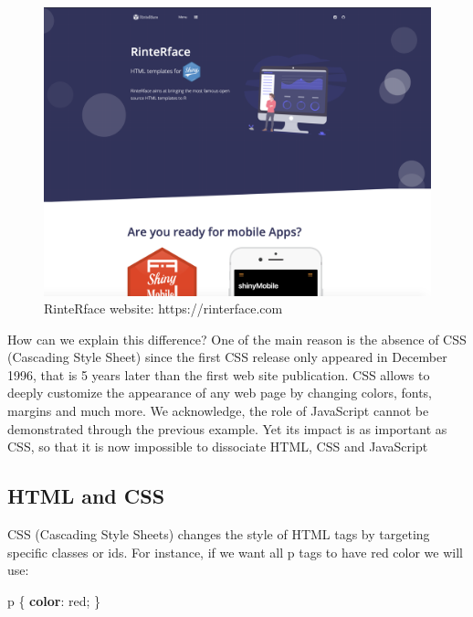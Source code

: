 \documentclass[]{book}
\newenvironment{Shaded}{\begin{snugshade}}{\end{snugshade}}
\newcommand{\DecValTok}[1]{\textcolor[rgb]{0.00,0.00,0.81}{#1}}
\newcommand{\KeywordTok}[1]{\textcolor[rgb]{0.13,0.29,0.53}{\textbf{#1}}}
\newcommand{\NormalTok}[1]{#1}
\begin{document}
\begin{figure}
\includegraphics[width=32.78in]{images/survival-kit/www-rinterface} \caption{RinteRface website: https://rinterface.com}\label{fig:www-rinterface}
\end{figure}

How can we explain this difference? One of the main reason is the absence of CSS (Cascading Style Sheet) since the first CSS release only appeared in December 1996, that is 5 years later than the first web site publication. CSS allows to deeply customize the appearance of any web page by changing colors, fonts, margins and much more. We acknowledge, the role of JavaScript cannot be demonstrated through the previous example. Yet its impact is as important as CSS, so that it is now impossible to dissociate HTML, CSS and JavaScript

\hypertarget{html-and-css}{%
\subsection{HTML and CSS}\label{html-and-css}}

CSS (Cascading Style Sheets) changes the style of HTML tags by targeting specific classes or ids. For instance, if we want all p tags to have red color we will use:

\begin{Shaded}
\begin{Highlighting}[]
\NormalTok{p \{}
  \KeywordTok{color}\NormalTok{: }\DecValTok{red}\NormalTok{;}
\NormalTok{\}}
\end{Highlighting}
\end{Shaded}
\end{document}
